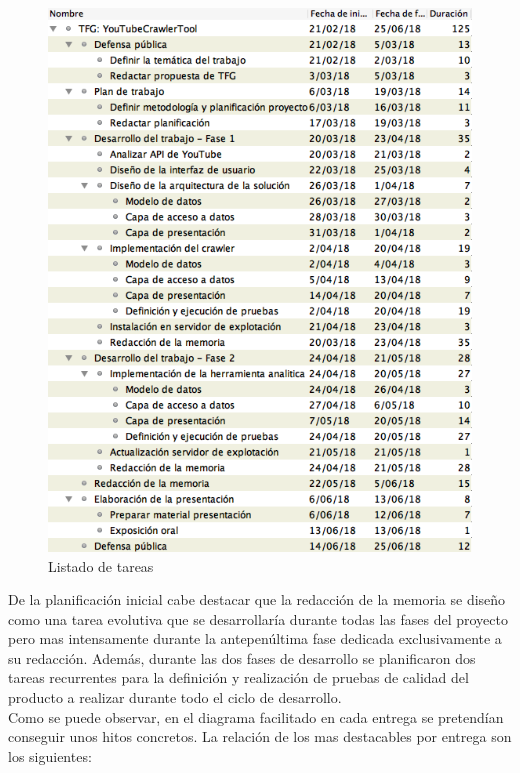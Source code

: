 \documentclass[11pt,a4paper]{article}
\begin{document}
\begin{figure}[H]
\centering
\includegraphics[scale=0.4]{planificacion/listado-tareas.png}
\caption{Listado de tareas}
\end{figure}
\newpage

De la planificación inicial cabe destacar que la redacción de la memoria se diseño como una tarea evolutiva que se desarrollaría durante todas las fases del proyecto pero mas intensamente durante la antepenúltima fase dedicada exclusivamente a su redacción. Además, durante las dos fases de desarrollo se  planificaron dos tareas recurrentes para la definición y realización de pruebas de calidad del producto a realizar durante todo el ciclo de desarrollo.
\\

Como se puede observar, en el diagrama facilitado en cada entrega se pretendían conseguir unos hitos concretos. La relación de los mas destacables por entrega son los siguientes:
\end{document}

